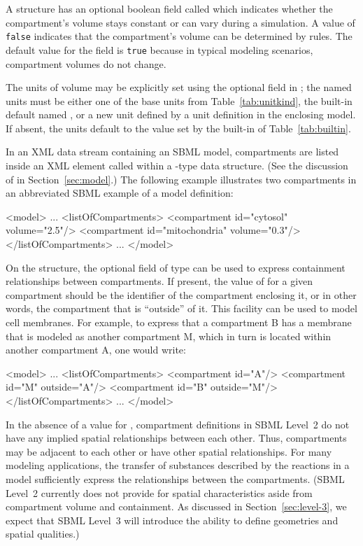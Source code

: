 \documentclass[10pt,twocolumntoc]{cekarticle}
\newcommand{\vref}[1]{\ref{#1}}
\begin{document}
A  structure has an optional boolean field called
 which indicates whether the compartment's volume stays
constant or can vary during a simulation.  A value of \texttt{false}
indicates that the compartment's volume can be determined by rules.  The
default value for the  field is \texttt{true} because in
typical modeling scenarios, compartment volumes do not change.

The units of volume may be explicitly set using the optional field
 in ; the named units must be either one
of the base units from Table~\vref{tab:unitkind}, the built-in default
named , or a new unit defined by a unit definition in the
enclosing model.  If absent, the units default to the value set by the
built-in  of Table~\ref{tab:builtin}.

In an XML data stream containing an SBML model, compartments are listed
inside an XML element called  within a
-type data structure.  (See the discussion of  in
Section~\ref{sec:model}.)  The following example illustrates two
compartments in an abbreviated SBML example of a model definition:

\begin{example}
<model>
    ...
    <listOfCompartments>
        <compartment id="cytosol" volume="2.5"/>
        <compartment id="mitochondria" volume="0.3"/>
    </listOfCompartments>
    ...
</model>
\end{example}

On the  structure, the optional field 
of type  can be used to express containment relationships
between compartments.  If present, the value of  for a given
compartment should be the identifier of the compartment enclosing it, or in
other words, the compartment that is ``outside'' of it.  This facility can
be used to model cell membranes.  For example, to express that a
compartment B has a membrane that is modeled as another compartment M,
which in turn is located within another compartment A, one would write:
\begin{example}
<model>
    ...
    <listOfCompartments>
        <compartment id="A"/>
        <compartment id="M" outside="A"/>
        <compartment id="B" outside="M"/>
    </listOfCompartments>
    ...
</model>
\end{example}

In the absence of a value for , compartment definitions in
SBML Level~2 do not have any implied spatial relationships between each
other.  Thus, compartments may be adjacent to each other or have other
spatial relationships.  For many modeling applications, the transfer of
substances described by the reactions in a model sufficiently express the
relationships between the compartments.  (SBML Level~2 currently does not
provide for spatial characteristics aside from compartment volume and
containment.  As discussed in Section~\ref{sec:level-3}, we expect that
SBML Level~3 will introduce the ability to define geometries and spatial
qualities.)
\end{document}
